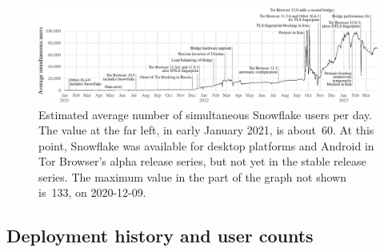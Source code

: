 \documentclass[letterpaper,twocolumn]{article}
\begin{document}
\begin{figure}[t]
\includegraphics{figures/users/users-global}
\caption{
Estimated average number of simultaneous Snowflake users per day.
The value at the far left,
in early January 2021, is about~60.
At this point, Snowflake was available
for desktop platforms and Android
in Tor Browser's alpha release series,
but not yet in the stable release series.
The maximum value in the part of the graph not shown
is~133, on \mbox{2020-12-09}.
}
\label{fig:user-counts}
\end{figure}

\subsection{Deployment history and user counts}
\label{sec:deployment}
\end{document}
